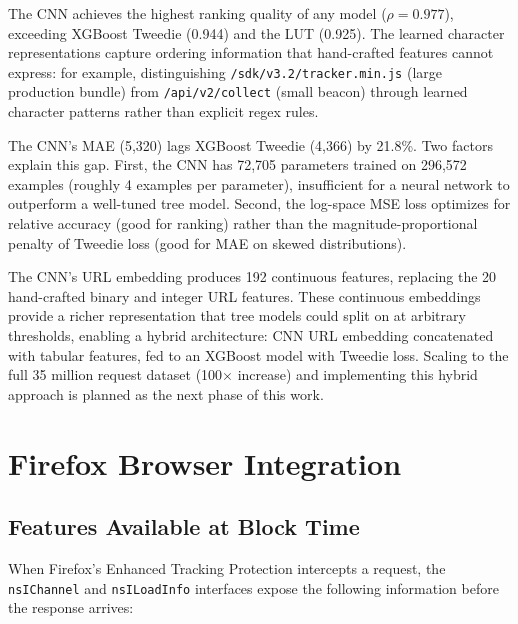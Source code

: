 \documentclass[11pt]{article}
\begin{document}
The CNN achieves the highest ranking quality of any model ($\rho = 0.977$), exceeding XGBoost Tweedie (0.944) and the LUT (0.925). The learned character representations capture ordering information that hand-crafted features cannot express: for example, distinguishing \texttt{/sdk/v3.2/tracker.min.js} (large production bundle) from \texttt{/api/v2/collect} (small beacon) through learned character patterns rather than explicit regex rules.

The CNN's MAE (5,320) lags XGBoost Tweedie (4,366) by 21.8\%. Two factors explain this gap. First, the CNN has 72,705 parameters trained on 296,572 examples (roughly 4 examples per parameter), insufficient for a neural network to outperform a well-tuned tree model. Second, the log-space MSE loss optimizes for relative accuracy (good for ranking) rather than the magnitude-proportional penalty of Tweedie loss (good for MAE on skewed distributions).

The CNN's URL embedding produces 192 continuous features, replacing the 20 hand-crafted binary and integer URL features. These continuous embeddings provide a richer representation that tree models could split on at arbitrary thresholds, enabling a hybrid architecture: CNN URL embedding concatenated with tabular features, fed to an XGBoost model with Tweedie loss. Scaling to the full 35 million request dataset (100$\times$ increase) and implementing this hybrid approach is planned as the next phase of this work.


\section{Firefox Browser Integration}
\label{sec:integration}

\subsection{Features Available at Block Time}

When Firefox's Enhanced Tracking Protection intercepts a request, the \texttt{nsIChannel} and \texttt{nsILoadInfo} interfaces expose the following information before the response arrives:
\end{document}
